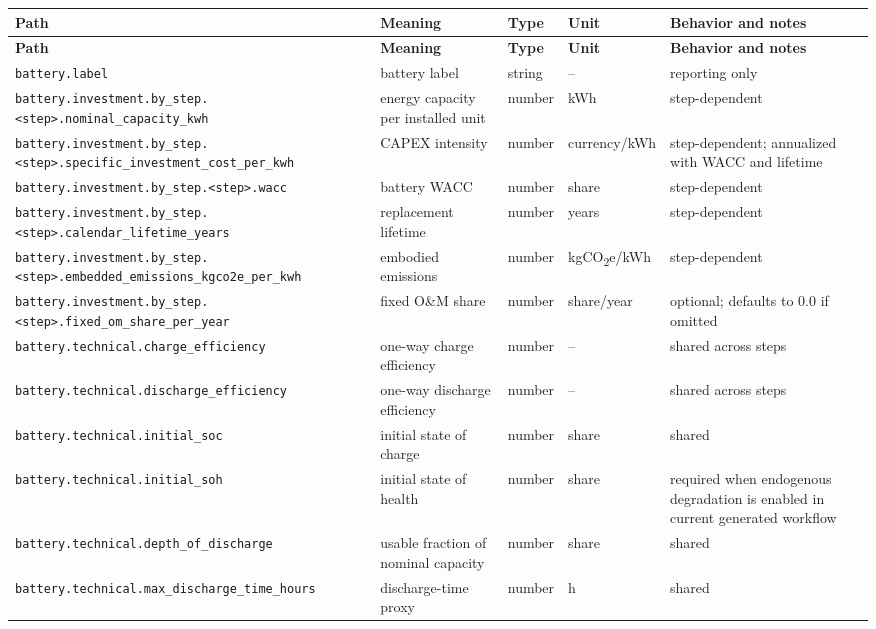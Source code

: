 \documentclass[11pt,a4paper]{report}
\newcommand{\code}[1]{\texttt{#1}}
\begin{document}
\begin{longtable}{p{}p{}p{}p{}p{}}
\toprule
\textbf{Path} & \textbf{Meaning} & \textbf{Type} & \textbf{Unit} & \textbf{Behavior and notes} \\
\midrule
\endfirsthead
\toprule
\textbf{Path} & \textbf{Meaning} & \textbf{Type} & \textbf{Unit} & \textbf{Behavior and notes} \\
\midrule
\endhead
\code{battery.label} & battery label & string & -- & reporting only \\
\code{battery.investment.by\_step.<step>.nominal\_capacity\_kwh} & energy capacity per installed unit & number & kWh & step-dependent \\
\code{battery.investment.by\_step.<step>.specific\_investment\_cost\_per\_kwh} & CAPEX intensity & number & currency/kWh & step-dependent; annualized with WACC and lifetime \\
\code{battery.investment.by\_step.<step>.wacc} & battery WACC & number & share & step-dependent \\
\code{battery.investment.by\_step.<step>.calendar\_lifetime\_years} & replacement lifetime & number & years & step-dependent \\
\code{battery.investment.by\_step.<step>.embedded\_emissions\_kgco2e\_per\_kwh} & embodied emissions & number & kgCO\textsubscript{2}e/kWh & step-dependent \\
\code{battery.investment.by\_step.<step>.fixed\_om\_share\_per\_year} & fixed O\&M share & number & share/year & optional; defaults to 0.0 if omitted \\
\code{battery.technical.charge\_efficiency} & one-way charge efficiency & number & -- & shared across steps \\
\code{battery.technical.discharge\_efficiency} & one-way discharge efficiency & number & -- & shared across steps \\
\code{battery.technical.initial\_soc} & initial state of charge & number & share & shared \\
\code{battery.technical.initial\_soh} & initial state of health & number & share & required when endogenous degradation is enabled in current generated workflow \\
\code{battery.technical.depth\_of\_discharge} & usable fraction of nominal capacity & number & share & shared \\
\code{battery.technical.max\_discharge\_time\_hours} & discharge-time proxy & number & h & shared \\

\end{longtable}
\end{document}
